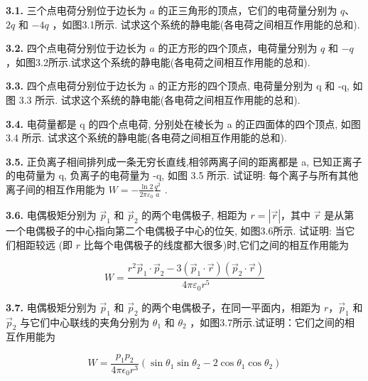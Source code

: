 \textbf{3.1.} 三个点电荷分别位于边长为 $a$ 的正三角形的顶点，它们的电荷量分别为 $q$、$2q$ 和 $-4q$ ，如图3.1所示. 试求这个系统的静电能(各电荷之间相互作用能的总和).

\vfill
\newpage

\textbf{3.2.} 四个点电荷分别位于边长为 $a$ 的正方形的四个顶点，电荷量分别为 $q$ 和 $-q$ ，如图3.2所示.试求这个系统的静电能(各电荷之间相互作用能的总和).

\vfill
\newpage

\textbf{3.3.} 四个点电荷分别位于边长为 a 的正方形的四个顶点, 电荷量分别为 q 和 -q, 如图 3.3 所示. 试求这个系统的静电能(各电荷之间相互作用能的总和).

\vfill
\newpage

\textbf{3.4.} 电荷量都是 q 的四个点电荷, 分别处在棱长为 a 的正四面体的四个顶点, 如图 3.4 所示. 试求这个系统的静电能(各电荷之间相互作用能的总和).

\vfill
\newpage

\textbf{3.5.} 正负离子相间排列成一条无穷长直线,相邻两离子间的距离都是 a, 已知正离子的电荷量为 q, 负离子的电荷量为 -q, 如图 3.5 所示. 试证明: 每个离子与所有其他离子间的相互作用能为 $\displaystyle W = -\frac{\ln 2}{2\pi \varepsilon_{0}} \frac{q^{2}}{a}$ .

\begin{center}
\end{center}

\vfill
\newpage

\textbf{3.6.} 电偶极矩分别为 $\vec{p}_1$ 和 $\vec{p}_2$ 的两个电偶极子, 相距为 $r = |\vec{r}|$，其中 $\vec{r}$ 是从第一个电偶极子的中心指向第二个电偶极子中心的位矢, 如图3.6所示. 试证明: 当它们相距较远 (即 $r$ 比每个电偶极子的线度都大很多)时,它们之间的相互作用能为

\[
W = \frac {r ^ {2} \vec{p} _ {1} \cdot \vec{p} _ {2} - 3 (\vec{p} _ {1} \cdot \vec{r}) (\vec{p} _ {2} \cdot \vec{r})}{4 \pi \varepsilon_ {0} r ^ {5}}
\]

\begin{center}
\end{center}

\vfill
\newpage

\textbf{3.7.} 电偶极矩分别为 $\vec{p}_1$ 和 $\vec{p}_2$ 的两个电偶极子，在同一平面内，相距为 $r$，$\vec{p}_1$ 和 $\vec{p}_2$ 与它们中心联线的夹角分别为 $\theta_1$ 和 $\theta_2$ ，如图3.7所示.试证明：它们之间的相互作用能为

\[
W = \frac {p _ {1} p _ {2}}{4 \pi \epsilon_ {0} r ^ {3}} (\sin \theta_ {1} \sin \theta_ {2} - 2 \cos \theta_ {1} \cos \theta_ {2})
\]


